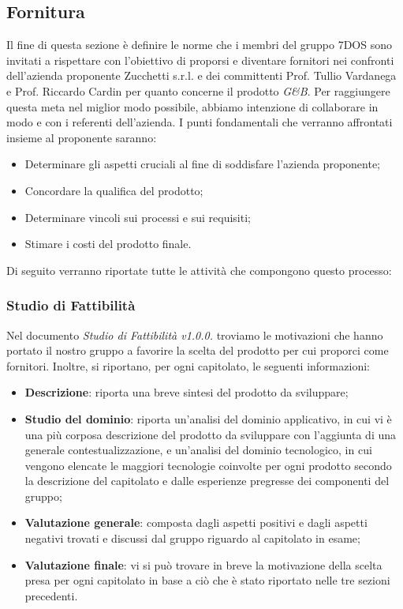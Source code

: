 \subsection{Fornitura}
Il fine di questa sezione è definire le norme che i membri del gruppo 7DOS sono invitati a rispettare con l'obiettivo di proporsi e diventare fornitori nei confronti dell'azienda proponente Zucchetti s.r.l. e dei committenti Prof. Tullio Vardanega e Prof. Riccardo Cardin per quanto concerne il prodotto \emph{G\&B}.
Per raggiungere questa meta nel miglior modo possibile, abbiamo intenzione di collaborare in modo  e  con i referenti dell'azienda.
I punti fondamentali che verranno affrontati insieme al proponente saranno:
\begin{itemize}
\item Determinare gli aspetti cruciali al fine di soddisfare l'azienda proponente;
\item Concordare la qualifica del prodotto;
\item Determinare vincoli sui processi e sui requisiti;
\item Stimare i costi del prodotto finale.
\end{itemize}
Di seguito verranno riportate tutte le attività che compongono questo processo:
\subsubsection{Studio di Fattibilità}
Nel documento \emph{Studio di Fattibilità v1.0.0.} troviamo le motivazioni che hanno portato il nostro gruppo a favorire la scelta del prodotto per cui proporci come fornitori. Inoltre, si riportano, per ogni capitolato, le seguenti informazioni:
\begin{itemize}
 	\item\textbf{{Descrizione}}: riporta una breve sintesi del prodotto da sviluppare;
 	\item\textbf{{Studio del dominio}}: riporta un'analisi del dominio applicativo, in cui vi è una più corposa descrizione del prodotto da sviluppare con l'aggiunta di una generale contestualizzazione, e un'analisi del dominio tecnologico, in cui vengono elencate le maggiori tecnologie coinvolte per ogni prodotto secondo la descrizione del capitolato e dalle esperienze pregresse dei componenti del gruppo;
 	\item\textbf{{Valutazione generale}}: composta dagli aspetti positivi e dagli aspetti negativi trovati e discussi dal gruppo riguardo al capitolato in esame;
 	\item\textbf{{Valutazione finale}}: vi si può trovare in breve la motivazione della scelta presa per ogni capitolato in base a ciò che è stato riportato nelle tre sezioni precedenti.
\end{itemize}
\pagebreak
